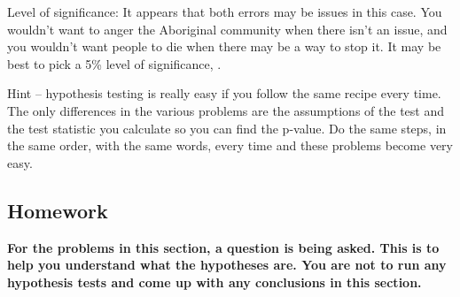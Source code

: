 \documentclass[]{book}
\begin{document}
Level of significance: It appears that both errors may be issues in this case. You wouldn't want to anger the Aboriginal community when there isn't an issue, and you wouldn't want people to die when there may be a way to stop it. It may be best to pick a 5\% level of significance, .

Hint -- hypothesis testing is really easy if you follow the same recipe every time. The only differences in the various problems are the assumptions of the test and the test statistic you calculate so you can find the p-value. Do the same steps, in the same order, with the same
words, every time and these problems become very easy.

\hypertarget{homework-20}{%
\subsection{Homework}\label{homework-20}}

\textbf{For the problems in this section, a question is being asked. This is to help you understand what the hypotheses are. You are not to run any hypothesis tests and come up with any conclusions in this section.}
\end{document}
